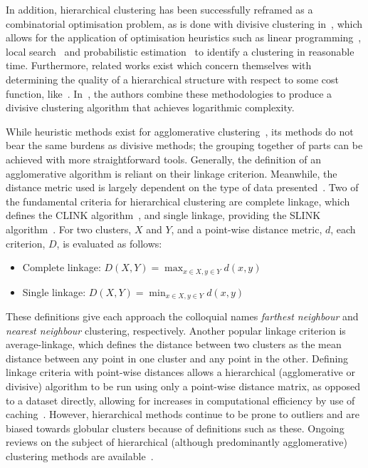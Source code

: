 In addition, hierarchical clustering has been successfully reframed as a
combinatorial optimisation problem, as is done with divisive clustering
in~\cite{Dasgupta2016}, which allows for the application of optimisation
heuristics such as linear programming~\cite{Roy2017}, local
search~\cite{Aljarah2019} and probabilistic estimation~\cite{Fan2015} to
identify a clustering in reasonable time. Furthermore, related works exist which
concern themselves with determining the quality of a hierarchical structure with
respect to some cost function, like~\cite{Bilu2012,Lyzinski2017}.
In~\cite{CohenAddad2018}, the authors combine these methodologies to produce a
divisive clustering algorithm that achieves logarithmic complexity.

While heuristic methods exist for agglomerative
clustering~\cite{Aljarah2019,Fan2015}, its methods do not bear the same burdens
as divisive methods; the grouping together of parts can be achieved with more
straightforward tools. Generally, the definition of an agglomerative
algorithm is reliant on their linkage criterion. Meanwhile, the
distance metric used is largely dependent on the type of data
presented~\cite{Nielsen2016}. Two of the fundamental criteria for hierarchical
clustering are complete linkage, which defines the CLINK
algorithm~\cite{Defays1977}, and single linkage, providing the SLINK
algorithm~\cite{Sibson1973}. For two clusters, \(X\) and \(Y\), and a point-wise
distance metric, \(d\), each criterion, \(D\), is evaluated as follows:

\begin{itemize}
    \item Complete linkage: \(D(X, Y) = \max_{x \in X, y \in Y} d(x, y)\)
    \item Single linkage: \(D(X, Y) = \min_{x \in X, y \in Y} d(x, y)\)
\end{itemize}

These definitions give each approach the colloquial names \emph{farthest
neighbour} and \emph{nearest neighbour} clustering, respectively. Another
popular linkage criterion is average-linkage, which defines the distance between
two clusters as the mean distance between any point in one cluster and any point
in the other. Defining linkage criteria with point-wise distances allows a
hierarchical (agglomerative or divisive) algorithm to be run using only a
point-wise distance matrix, as opposed to a dataset directly, allowing for
increases in computational efficiency by use of caching~\cite{Nielsen2016}.
However, hierarchical methods continue to be prone to outliers and are biased
towards globular clusters because of definitions such as these. Ongoing reviews
on the subject of hierarchical (although predominantly agglomerative) clustering
methods are available~\cite{Murtagh1983,Murtagh2012,Murtagh2017}.

